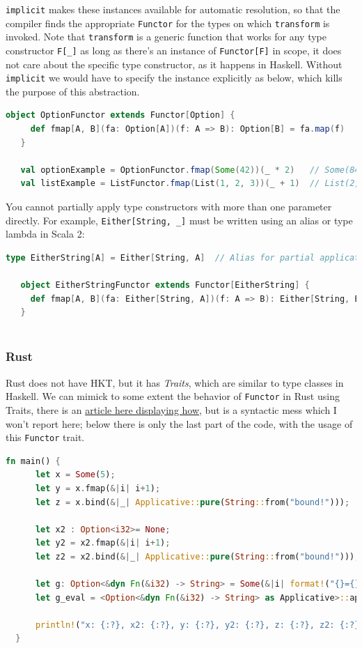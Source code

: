 \lstinline|implicit| makes these instances available for automatic resolution, so that the compiler finds the appropriate \lstinline|Functor| for the types on which \lstinline|transform| is invoked.
Note that \lstinline|transform| is a generic function that works for any type constructor \lstinline|F[_]| as long as there's an instance of \lstinline|Functor[F]| in scope, it does not care about the specific type constructor, as it happens in Haskell.
Without \lstinline|implicit| we would have to specify the instance explicitly as below, which kills the purpose of this abstraction.
\begin{lstlisting}[language=Scala]
   object OptionFunctor extends Functor[Option] {
     def fmap[A, B](fa: Option[A])(f: A => B): Option[B] = fa.map(f)
   }
   
   val optionExample = OptionFunctor.fmap(Some(42))(_ * 2)   // Some(84
   val listExample = ListFunctor.fmap(List(1, 2, 3))(_ + 1)  // List(2, 3, 4)
\end{lstlisting}

You cannot partially apply type constructors with more than one parameter directly. For example, \lstinline|Either[String, _]| must be written using an alias or type lambda in Scala 2:
\begin{lstlisting}[language=Scala]
   type EitherString[A] = Either[String, A]  // Alias for partial application

   object EitherStringFunctor extends Functor[EitherString] {
     def fmap[A, B](fa: Either[String, A])(f: A => B): Either[String, B] = fa.map(f)
   }
   
\end{lstlisting}

\subsubsection{Rust}
\label{sec:rust_hkt}
Rust does not have HKT, but it has \textit{Traits}, which are similar to type classes in Haskell.
We can mimick to some extent the behavior of \lstinline|Functor| in Rust using Traits, there is an \href{https://hugopeters.me/posts/14/}{article here displaying how}, but is a syntactic mess which I won't report here; below there is only the last part of the code, with the usage of this \lstinline|Functor| trait.
\begin{lstlisting}[language=Rust]
   fn main() {
      let x = Some(5);
      let y = x.fmap(&|i| i+1);
      let z = x.bind(&|_| Applicative::pure(String::from("bound!")));
  
      let x2 : Option<i32>= None;
      let y2 = x2.fmap(&|i| i+1);
      let z2 = x2.bind(&|_| Applicative::pure(String::from("bound!")));
  
      let g: Option<&dyn Fn(&i32) -> String> = Some(&|i| format!("{}={}", i, i));
      let g_eval = <Option<&dyn Fn(&i32) -> String> as Applicative>::ap(&g, &Some(69));
  
      println!("x: {:?}, x2: {:?}, y: {:?}, y2: {:?}, z: {:?}, z2: {:?}, geval: {:?}", x, x2, y, y2, z, z2, g_eval);
  }
\end{lstlisting}

